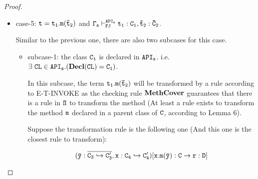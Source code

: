 \documentclass[letterpaper]{article}
\newcommand{\env}[2]{\vdash_{#1}^{#2}}
\begin{document}
\begin{proof}
\begin{itemize}
\begin{itemize}
    To finish the proof of the subcase, we need the following facts:
    \begin{itemize}
      \item According to the rule E-DECLARATION, the class definition is transformed to $\tt \Pi(CL)=class~\Pi(C)~extends~\Pi(D)~\{\overline{\Pi(C_2}~f;~\Pi(K)~\overline{\Pi(M)}\}$. Thus $\tt\mathsf{fields}(\Pi(C))=\overline{\Pi(C_2)}$
      \item By induction, we have $\tt \Gamma_d\env{FJ}{API_d}\overline{\Pi(t_1)}:\bar{C}'_1$ and $\tt \bar{C}'_1 <: \overline{\Pi(C_1)}$.
      \item By the typing rule FJ-NEW, we have $\tt \bar{C}_1<:\bar{C}_2$. And by Lemma 2, we have $\tt \overline{\Pi(C_1)} <:\overline{\Pi(C_2)}$.
    \end{itemize}
    With these facts, we have the following judgment:
    \[
      \begin{array}{ccc}
      \infer
      {\tt \Gamma_d\env{FJ}{API_d}new~\Pi(C)(\overline{\Pi(t_1)}):\Pi(C)}
      {
       \tt \mathsf{fields}(\Pi(C))=\overline{\Pi(C_2)}
      &\tt \Gamma_d\env{FJ}{API_d}\overline{\Pi(t_1)}:\bar{C}'_1
      &\tt \bar{C}'_1<:\overline{\Pi(C_1)} <:\overline{\Pi(C_2)}
      }
      \end{array}
    \]
    And this proved the subcase.
  \end{itemize} 
  With these two subcases proved, the case for object creation is proved.

  \item case-5: $\tt t = t_1.m(\bar{t}_2)$ and $\tt \Gamma_s\env{FJ}{API_s}t_1:C_1,\bar{t}_2:\bar{C}_2$.

  Similar to the previous one, there are also two subcases for this case.
  \begin{itemize}
    \item subcase-1: the class $\tt C_1$ is declared in $\tt API_s$. i.e. $\tt \exists~CL\in API_s.(\mathbf{Decl}(CL)=C_1)$.

    In this subcase, the term $\tt t_1.m(\bar{t}_2)$ will be transformed by a rule according to E-T-INVOKE as the checking rule $\tt \mathbf{MethCover}$ guarantees that there is a rule in $\tt \Pi$ to transform the method (At least a rule exists to transform the method $\tt m$ declared in a parent class of $\tt C$, according to Lemma 6).

    Suppose the transformation rule is the following one (And this one is the closest rule to transform):

    $$\tt (\bar{y}:\overline{C_3\hookrightarrow C'_3}, x:C_4\hookrightarrow C'_4)[x.m(\bar{y}):C\rightarrow r:D]$$


\end{itemize}
\end{itemize}
\end{proof}
\end{document}
